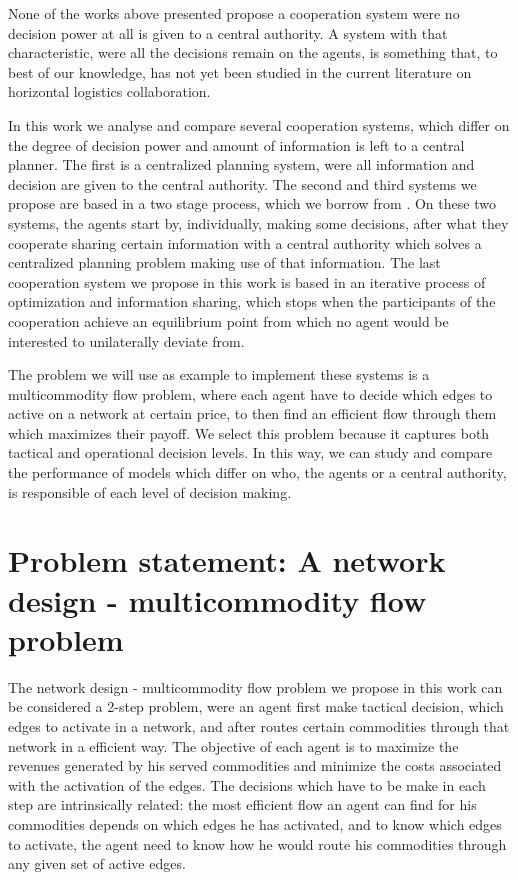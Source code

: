 \documentclass{article}
\begin{document}
None of the works above presented propose a cooperation system were no decision power at all is given to a central authority. A system with that characteristic, were all the decisions remain on the agents, is something that, to best of our knowledge, has not yet been studied in the current literature on horizontal logistics collaboration.


In this work we analyse and compare several cooperation systems, which differ on the degree of decision power and amount of information is left to a central planner. The first is a centralized planning system, were all information and decision are given to the central authority. The second and third systems we propose are based in a two stage process, which we borrow from \cite{ANUPINDI2001}. On these two systems, the agents start by, individually, making some decisions, after what they cooperate sharing certain information with a central authority which solves a centralized planning problem making use of that information. The last cooperation system we propose in this work is based in an iterative process of optimization and information sharing, which stops when the participants of the cooperation achieve an equilibrium point from which no agent would be interested to unilaterally deviate from. 

The problem we will use as example to implement these systems is a multicommodity flow problem, where each agent have to decide which edges to active on a network at certain price, to then find an efficient flow through them which maximizes their payoff. We select this problem because it captures both tactical and operational decision levels. In this way, we can study and compare the performance of models which differ on who, the agents or a central authority, is responsible of each level of decision making.

\section{Problem statement: A network design - multicommodity flow problem}\label{seq:probdefinition} 

The network design - multicommodity flow problem we propose in this work can be considered a 2-step problem, were an agent first make tactical decision, which edges to activate in a network, and after routes certain commodities through that network in a efficient way.
The objective of each agent is to maximize the revenues generated by his served commodities and minimize the costs associated with the activation of the edges.
The decisions which have to be make in each step are intrinsically related: the most efficient flow an agent can find for his commodities depends on which edges he has activated, and to know which edges to activate, the agent need to know how he would route his commodities through any given set of active edges. 
\end{document}
